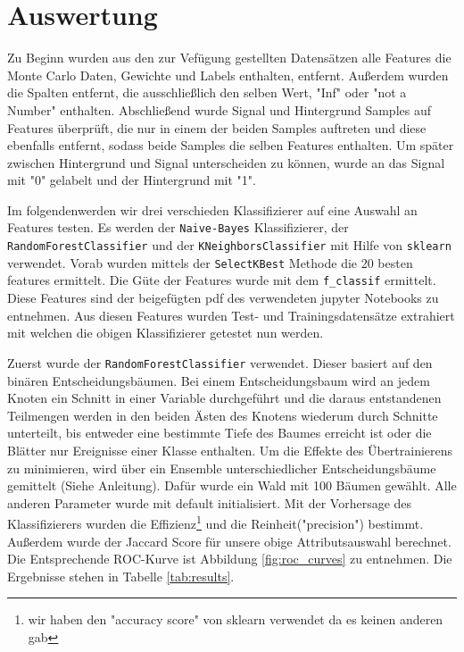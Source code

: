\section{Auswertung}
\label{sec:auswertung}

Zu Beginn wurden aus den zur Vef\"ugung gestellten Datens\"atzen alle Features die Monte Carlo Daten, Gewichte und Labels enthalten, entfernt. Au\ss erdem wurden die Spalten entfernt, die ausschlie\ss lich den selben Wert, "Inf" oder "not a Number" enthalten.
Abschlie\ss end wurde Signal und Hintergrund Samples auf Features \"uberpr\"uft, die nur in einem der beiden Samples auftreten und diese ebenfalls entfernt, sodass beide Samples die selben Features enthalten.
Um sp\"ater zwischen Hintergrund und Signal unterscheiden zu k\"onnen, wurde an das Signal mit "0" gelabelt und der Hintergrund mit "1".

Im folgendenwerden wir drei verschieden Klassifizierer auf eine Auswahl an Features testen. Es werden der \texttt{Naive-Bayes} Klassifizierer, der \texttt{RandomForestClassifier} und der \texttt{KNeighborsClassifier} mit Hilfe von \texttt{sklearn} verwendet.
Vorab wurden mittels der \texttt{SelectKBest} Methode die 20 besten features ermittelt. Die G\"ute der Features wurde mit dem \texttt{f\_classif} ermittelt.
Diese Features sind der beigef\"ugten pdf des verwendeten jupyter Notebooks zu entnehmen.
Aus diesen Features wurden Test- und Trainingsdatens\"atze extrahiert mit welchen die obigen Klassifizierer getestet nun werden.

Zuerst wurde der \texttt{RandomForestClassifier} verwendet. Dieser basiert auf den bin\"aren Entscheidungsb\"aumen.
Bei einem Entscheidungsbaum wird an jedem Knoten ein Schnitt in einer Variable durchgeführt und die daraus entstandenen Teilmengen werden in den beiden Ästen des Knotens wiederum durch Schnitte unterteilt, bis entweder eine bestimmte Tiefe
des Baumes erreicht ist oder die Blätter nur Ereignisse einer Klasse enthalten. Um die Effekte des Übertrainierens zu minimieren, wird über ein Ensemble unterschiedlicher
Entscheidungsbäume gemittelt (Siehe Anleitung).
Daf\"ur wurde ein Wald mit 100 B\"aumen gew\"ahlt. Alle anderen Parameter wurde mit default initialisiert.
Mit der Vorhersage des Klassifizierers wurden die Effizienz\footnote{wir haben den "accuracy score" von sklearn verwendet da es keinen anderen gab} und die Reinheit("precision") bestimmt.
Au\ss erdem wurde der Jaccard Score f\"ur unsere obige Attributsauswahl berechnet. Die Entsprechende ROC-Kurve ist Abbildung \ref{fig:roc_curves} zu entnehmen.
Die Ergebnisse stehen in Tabelle \ref{tab:results}.

